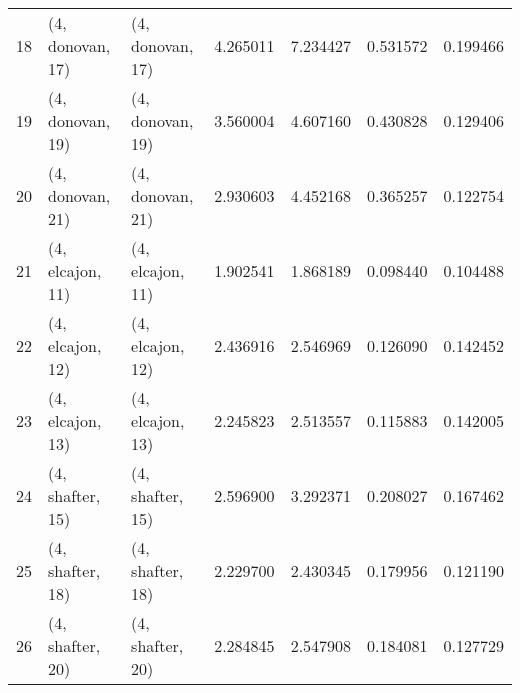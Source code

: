 \begin{tabular}{lllrrrr}
18 &  (4, donovan, 17) &  (4, donovan, 17) &  4.265011 &  7.234427 &   0.531572 &  0.199466 \\
19 &  (4, donovan, 19) &  (4, donovan, 19) &  3.560004 &  4.607160 &   0.430828 &  0.129406 \\
20 &  (4, donovan, 21) &  (4, donovan, 21) &  2.930603 &  4.452168 &   0.365257 &  0.122754 \\
21 &  (4, elcajon, 11) &  (4, elcajon, 11) &  1.902541 &  1.868189 &   0.098440 &  0.104488 \\
22 &  (4, elcajon, 12) &  (4, elcajon, 12) &  2.436916 &  2.546969 &   0.126090 &  0.142452 \\
23 &  (4, elcajon, 13) &  (4, elcajon, 13) &  2.245823 &  2.513557 &   0.115883 &  0.142005 \\
24 &  (4, shafter, 15) &  (4, shafter, 15) &  2.596900 &  3.292371 &   0.208027 &  0.167462 \\
25 &  (4, shafter, 18) &  (4, shafter, 18) &  2.229700 &  2.430345 &   0.179956 &  0.121190 \\
26 &  (4, shafter, 20) &  (4, shafter, 20) &  2.284845 &  2.547908 &   0.184081 &  0.127729 \\
\bottomrule
\end{tabular}
